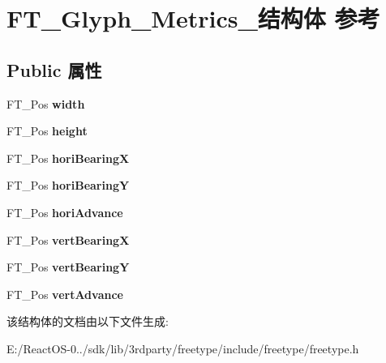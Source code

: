 \hypertarget{struct_f_t___glyph___metrics__}{}\section{F\+T\+\_\+\+Glyph\+\_\+\+Metrics\+\_\+结构体 参考}
\label{struct_f_t___glyph___metrics__}
\subsection*{Public 属性}
\begin{DoxyCompactItemize}
\item 
\mbox{\label{struct_f_t___glyph___metrics___a0ff1be869e6a28d1f2990b0e5719dca9}} 
F\+T\+\_\+\+Pos {\bfseries width}
\item 
\mbox{\label{struct_f_t___glyph___metrics___aa2a76ec448ec9d18acf343f01b77cb21}} 
F\+T\+\_\+\+Pos {\bfseries height}
\item 
\mbox{\label{struct_f_t___glyph___metrics___a2afc877f52c8a8910ec144a1948186cc}} 
F\+T\+\_\+\+Pos {\bfseries hori\+BearingX}
\item 
\mbox{\label{struct_f_t___glyph___metrics___afd97c10d43ed1f66598a18884468b536}} 
F\+T\+\_\+\+Pos {\bfseries hori\+BearingY}
\item 
\mbox{\label{struct_f_t___glyph___metrics___af12db260a90b8a7c938ad48ebf20ccbe}} 
F\+T\+\_\+\+Pos {\bfseries hori\+Advance}
\item 
\mbox{\label{struct_f_t___glyph___metrics___aead5c5637b983b811738bff3bcea8cea}} 
F\+T\+\_\+\+Pos {\bfseries vert\+BearingX}
\item 
\mbox{\label{struct_f_t___glyph___metrics___a7f1aba91b86fddeb11030eab15dcce08}} 
F\+T\+\_\+\+Pos {\bfseries vert\+BearingY}
\item 
\mbox{\label{struct_f_t___glyph___metrics___a594f43c64fe5c12a399a0f0a47c04990}} 
F\+T\+\_\+\+Pos {\bfseries vert\+Advance}
\end{DoxyCompactItemize}


该结构体的文档由以下文件生成\+:\begin{DoxyCompactItemize}
\item 
E\+:/\+React\+O\+S-\/0../sdk/lib/3rdparty/freetype/include/freetype/freetype.\+h\end{DoxyCompactItemize}
